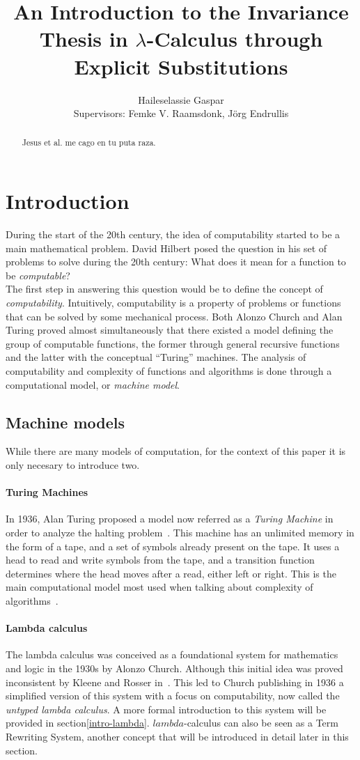\documentclass[12pt]{article}
\title{An Introduction to the Invariance Thesis in $\lambda$-Calculus through Explicit Substitutions}
\author{Haileselassie Gaspar\\[1cm]{\small Supervisors: Femke V. Raamsdonk, Jörg Endrullis}}
\begin{document}
\maketitle
\begin{abstract}
  Jesus et al. me cago en tu puta raza.
\end{abstract}
\section{Introduction}
During the start of the 20th century, the idea of computability started to be a main mathematical problem. David Hilbert posed the question in his set of problems to solve during the 20th century: What does it mean for a function to be \textit{computable}? \\
The first step in answering this question would be to define the concept of \textit{computability}. Intuitively, computability is a property of problems or functions that can be solved by some mechanical process. Both Alonzo Church and Alan Turing proved almost simultaneously that there existed a model defining the group of computable functions, the former through general recursive functions and the latter with the conceptual \enquote{Turing} machines.
The analysis of computability and complexity of functions and algorithms is done through a computational model, or \textit{machine model}.
\subsection{Machine models}
While there are many models of computation, for the context of this paper it is only necesary to introduce two.

\paragraph{Turing Machines}
In 1936, Alan Turing proposed a model now referred as a \textit{Turing Machine} in order to analyze the halting problem~\cite{on-computable-numbers}. This machine has an unlimited memory in the form of a tape, and a set of symbols already present on the tape. It uses a head to read and write symbols from the tape, and a transition function determines where the head moves after a read, either left or right. This is the main computational model most used when talking about complexity of algorithms~\cite{computation-theory}.

\paragraph{Lambda calculus}
The lambda calculus was conceived as a foundational system for mathematics and logic in the 1930s by Alonzo Church. Although this initial idea was proved inconsistent by Kleene and Rosser in~\cite{rosser-kleene-inconsistency}. This led to Church publishing in 1936 a simplified version of this system with a focus on computability, now called the \textit{untyped lambda calculus}. A more formal introduction to this system will be provided in section\ref{intro-lambda}. $lambda$-calculus can also be seen as a Term Rewriting System, another concept that will be introduced in detail later in this section.
\end{document}
